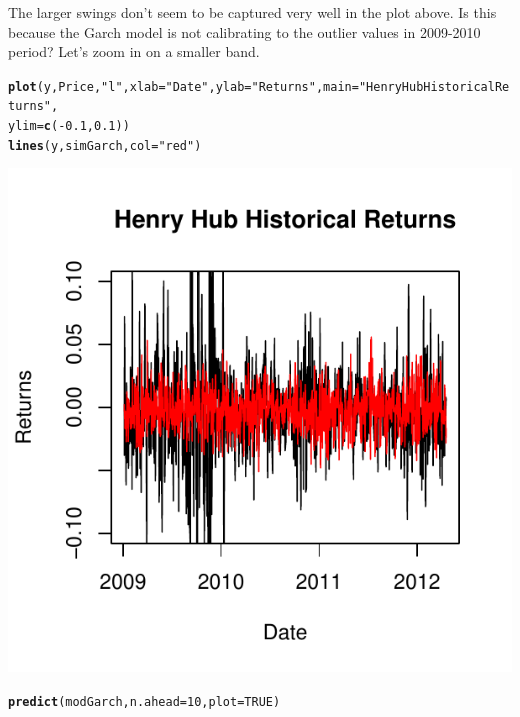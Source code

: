 \documentclass[10pt]{article}\usepackage[]{graphicx}\usepackage[]{color}
\makeatletter
\def\maxwidth{ %
  \ifdim\Gin@nat@width>\linewidth
    \linewidth
  \else
    \Gin@nat@width
  \fi
}
\newcommand{\hlnum}[1]{\textcolor[rgb]{0.686,0.059,0.569}{#1}}%
\newcommand{\hlstr}[1]{\textcolor[rgb]{0.192,0.494,0.8}{#1}}%
\newcommand{\hlopt}[1]{\textcolor[rgb]{0,0,0}{#1}}%
\newcommand{\hlstd}[1]{\textcolor[rgb]{0.345,0.345,0.345}{#1}}%
\newcommand{\hlkwc}[1]{\textcolor[rgb]{0.333,0.667,0.333}{#1}}%
\newcommand{\hlkwd}[1]{\textcolor[rgb]{0.737,0.353,0.396}{\textbf{#1}}}%
\newenvironment{kframe}{%
 \def\at@end@of@kframe{}%
 \ifinner\ifhmode%
  \def\at@end@of@kframe{\end{minipage}}%
  \begin{minipage}{\columnwidth}%
 \fi\fi%
 \def\FrameCommand##1{\hskip\@totalleftmargin \hskip-\fboxsep
 \colorbox{shadecolor}{##1}\hskip-\fboxsep
     \hskip-\linewidth \hskip-\@totalleftmargin \hskip\columnwidth}%
 \MakeFramed {\advance\hsize-\width
   \@totalleftmargin\z@ \linewidth\hsize
   \@setminipage}}%
 {\par\unskip\endMakeFramed%
 \at@end@of@kframe}
\newenvironment{knitrout}{}{} %
\makeatother
\begin{document}
The larger swings don't seem to be captured very well in the plot above. Is this because the Garch model is not calibrating to the outlier values in 2009-2010 period? Let's zoom in on a smaller band.

\begin{knitrout}
\color{fgcolor}\begin{kframe}
\begin{alltt}
\hlkwd{plot}\hlstd{(y, Price,} \hlstr{"l"}\hlstd{,} \hlkwc{xlab} \hlstd{=} \hlstr{"Date"}\hlstd{,} \hlkwc{ylab} \hlstd{=} \hlstr{"Returns"}\hlstd{,} \hlkwc{main} \hlstd{=} \hlstr{"Henry Hub Historical Returns"}\hlstd{,}
    \hlkwc{ylim} \hlstd{=} \hlkwd{c}\hlstd{(}\hlopt{-}\hlnum{0.1}\hlstd{,} \hlnum{0.1}\hlstd{))}
\hlkwd{lines}\hlstd{(y, simGarch,} \hlkwc{col} \hlstd{=} \hlstr{"red"}\hlstd{)}
\end{alltt}
\end{kframe}

{\centering \includegraphics[width=\maxwidth]{figure/unnamed-chunk-91} 

}


\begin{kframe}\begin{alltt}
\hlkwd{predict}\hlstd{(modGarch,} \hlkwc{n.ahead} \hlstd{=} \hlnum{10}\hlstd{,} \hlkwc{plot} \hlstd{=} \hlnum{TRUE}\hlstd{)}
\end{alltt}
\end{kframe}


\end{knitrout}
\end{document}
